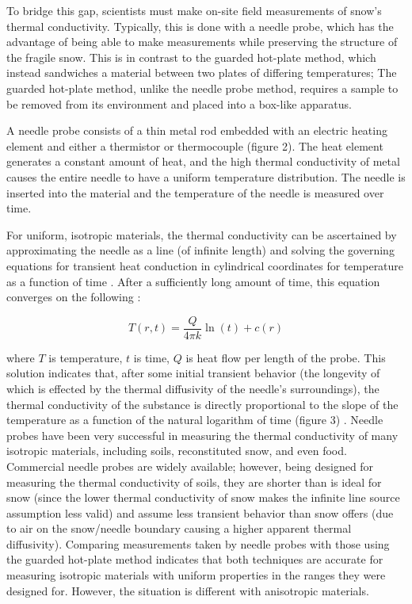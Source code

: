 \documentclass[12pt, letterpaper]{article}
\begin{document}
To bridge this gap, scientists must make on-site field measurements of snow's thermal conductivity. Typically, this is done with a needle probe, which has the advantage of being able to make measurements while preserving the structure of the fragile snow. This is in contrast to the guarded hot-plate method, which instead sandwiches a material between two plates of differing temperatures; The guarded hot-plate method, unlike the needle probe method, requires a sample to be removed from its environment and placed into a box-like apparatus.

A needle probe consists of a thin metal rod embedded with an electric heating element and either a thermistor or thermocouple (figure 2). The heat element generates a constant amount of heat, and the high thermal conductivity of metal causes the entire needle to have a uniform temperature distribution. The needle is inserted into the material and the temperature of the needle is measured over time. %

For uniform, isotropic materials, the thermal conductivity can be ascertained by approximating the needle as a line (of infinite length) and solving the governing equations for transient heat conduction in cylindrical coordinates for temperature as a function of time \cite{probetheory}. After a sufficiently long amount of time, this equation converges on the following \cite{werc}:

\begin{equation*}
T(r,t) = \frac{Q}{4\pi k}\ln(t) + c(r)
\end{equation*}

where \(T\) is temperature, \(t\) is time, \(Q\) is heat flow per length of the probe. This solution indicates that, after some initial transient behavior (the longevity of which is effected by the thermal diffusivity of the needle's surroundings), the thermal conductivity of the substance is directly proportional to the slope of the temperature as a function of the natural logarithm of time (figure 3) \cite{probetheory}.
Needle probes have been very successful in measuring the thermal conductivity of many isotropic materials, including soils, reconstituted snow, and even food. Commercial needle probes are widely available; however, being designed for measuring the thermal conductivity of soils, they are shorter than is ideal for snow (since the lower thermal conductivity of snow makes the infinite line source assumption less valid) and assume less transient behavior than snow offers (due to air on the snow/needle boundary causing a higher apparent thermal diffusivity). Comparing measurements taken by needle probes with those using the guarded hot-plate method indicates that both techniques are accurate for measuring isotropic materials with uniform properties in the ranges they were designed for. However, the situation is different with anisotropic materials. %
\end{document}
